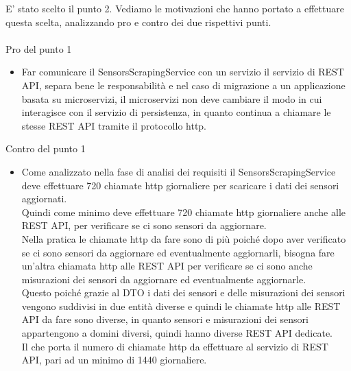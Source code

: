 E' stato scelto il punto 2. Vediamo le motivazioni che hanno portato a effettuare questa scelta, analizzando pro e 
contro dei due rispettivi punti.
\\\\
Pro del punto 1
\begin{itemize}
    \item Far comunicare il SensorsScrapingService con un servizio il servizio di REST API, separa bene le responsabilità e 
        nel caso di migrazione a un applicazione basata su microservizi, il microservizi non deve cambiare il modo in cui interagisce
        con il servizio di persistenza, in quanto continua a chiamare le stesse REST API tramite il protocollo http.
\end{itemize}
\leavevmode\newline
Contro del punto 1
\begin{itemize}
    \item Come analizzato nella fase di analisi dei requisiti il SensorsScrapingService deve effettuare 720 chiamate http giornaliere
        per scaricare i dati dei sensori aggiornati. 
        \\
        Quindi come minimo deve effettuare 720 chiamate http giornaliere anche alle REST API, per verificare se ci sono sensori
        da aggiornare. 
        \\
        Nella pratica le chiamate http da fare sono di più poiché dopo aver verificato se ci sono sensori da aggiornare ed
        eventualmente aggiornarli, bisogna fare un'altra chiamata http alle REST API per verificare se ci sono anche misurazioni dei sensori
        da aggiornare ed eventualmente aggiornarle. 
        \\
        Questo poiché grazie al DTO i dati dei sensori e delle misurazioni dei sensori vengono suddivisi in due entità diverse e quindi 
        le chiamate http alle REST API da fare sono diverse, in quanto sensori e misurazioni dei sensori appartengono a domini diversi, quindi
        hanno diverse REST API dedicate.
        \\
        Il che porta il numero di chiamate http da effettuare al servizio di REST API, pari ad un minimo di 1440 giornaliere.
\end{itemize}

\leavevmode\newline
